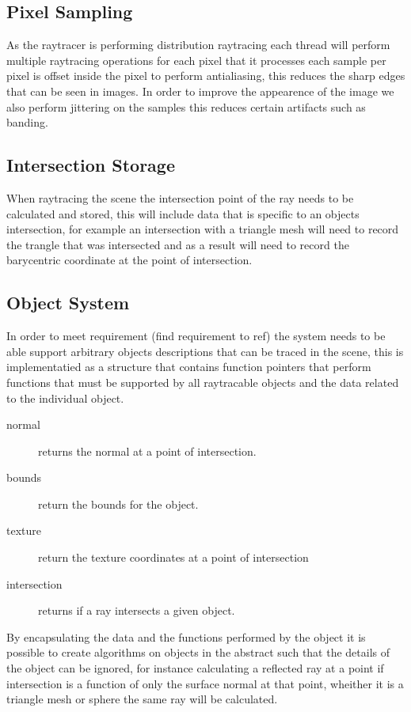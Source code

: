 \subsection{Pixel Sampling}
As the raytracer is performing distribution raytracing each thread will perform multiple raytracing operations for each pixel
that it processes each sample per pixel is offset inside the pixel to perform antialiasing, this reduces the sharp edges that
can be seen in images. In order to improve the appearence of the image we also perform jittering on the samples this reduces
certain artifacts such as banding. 


\subsection{Intersection Storage}
When raytracing the scene the intersection point of the ray needs to be calculated and stored, this will include data that
is specific to an objects intersection, for example an intersection with a triangle mesh will need to record the trangle
that was intersected and as a result will need to record the barycentric coordinate at the point of intersection.

\subsection{Object System}
In order to meet requirement \todo(find requirement to ref) the system needs to be able support arbitrary objects descriptions
that can be traced in the scene, this is implementatied as a structure that contains function pointers that perform functions
that must be supported by all raytracable objects and the data related to the individual object.

\begin{description}
\item[normal] returns the normal at a point of intersection.
\item[bounds] return the bounds for the object.
\item[texture] return the texture coordinates at a point of intersection
\item[intersection] returns if a ray intersects a given object.
\end{description}

By encapsulating the data and the functions performed by the object it is possible to create algorithms on objects in the
abstract such that the details of the object can be ignored, for instance calculating a reflected ray at a point if intersection
is a function of only the surface normal at that point, wheither it is a triangle mesh or sphere the same ray will be calculated.

